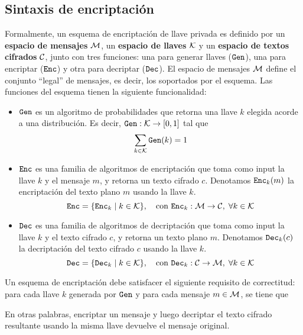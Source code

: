 

\subsection{Sintaxis de encriptación}
Formalmente, un esquema de encriptación de llave privada es definido por un \textbf{espacio de mensajes} $\mathcal{M}$, un \textbf{espacio de llaves} $\mathcal{K}$ y un \textbf{espacio de textos cifrados} $\mathcal{C}$, junto con tres funciones: una para generar llaves ($\texttt{Gen}$), una para encriptar ($\texttt{Enc}$) y otra para decriptar ($\texttt{Dec}$). El espacio de mensajes $\mathcal{M}$ define el conjunto ``legal'' de mensajes, es decir, los soportados por el esquema. Las funciones del esquema tienen la siguiente funcionalidad:
\begin{itemize}
    \item $\texttt{Gen}$ es un algoritmo de probabilidades que retorna una llave $k$ elegida acorde a una distribución. Es decir, $\texttt{Gen}: \mathcal{K} \to [0,1]$ tal que
          $$
              \sum_{k\in \mathcal{K}}\texttt{Gen}(k) = 1
          $$

    \item $\texttt{Enc}$ es una familia de algoritmos de encriptación que toma como input la llave $k$ y el mensaje $m$, y retorna un texto cifrado $c$. Denotamos $\texttt{Enc}_k(m)$ la encriptación del texto plano $m$ usando la llave $k$.
          $$
              \texttt{Enc} = \{ \texttt{Enc}_k \mid k \in \mathcal{K} \}, \quad \text{con } \texttt{Enc}_k: \mathcal{M} \to \mathcal{C}, \;\forall k \in \mathcal{K}
          $$

    \item $\texttt{Dec}$ es una familia de algoritmos de decriptación que toma como input la llave $k$ y el texto cifrado $c$, y retorna un texto plano $m$. Denotamos $\texttt{Dec}_k(c)$ la decriptación del texto cifrado $c$ usando la llave $k$.
          $$
              \texttt{Dec} = \{ \texttt{Dec}_k \mid k \in \mathcal{K} \}, \quad \text{con } \texttt{Dec}_k: \mathcal{C} \to \mathcal{M}, \;\forall k \in \mathcal{K}
          $$
\end{itemize}

Un esquema de encriptación debe satisfacer el siguiente requisito de correctitud: para cada llave $k$ generada por $\texttt{Gen}$ y para cada mensaje $m \in \mathcal{M}$, se tiene que


En otras palabras, encriptar un mensaje y luego decriptar el texto cifrado resultante usando la misma llave devuelve el mensaje original.


